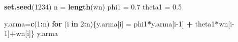 \documentclass[
]{article}
\newenvironment{Shaded}{\begin{snugshade}}{\end{snugshade}}
\newcommand{\ControlFlowTok}[1]{\textcolor[rgb]{0.13,0.29,0.53}{\textbf{#1}}}
\newcommand{\DecValTok}[1]{\textcolor[rgb]{0.00,0.00,0.81}{#1}}
\newcommand{\FloatTok}[1]{\textcolor[rgb]{0.00,0.00,0.81}{#1}}
\newcommand{\FunctionTok}[1]{\textcolor[rgb]{0.13,0.29,0.53}{\textbf{#1}}}
\newcommand{\NormalTok}[1]{#1}
\newcommand{\OtherTok}[1]{\textcolor[rgb]{0.56,0.35,0.01}{#1}}
\newcommand{\SpecialCharTok}[1]{\textcolor[rgb]{0.81,0.36,0.00}{\textbf{#1}}}
\begin{document}
\begin{Shaded}
\begin{Highlighting}[]
\FunctionTok{set.seed}\NormalTok{(}\DecValTok{1234}\NormalTok{)}
\NormalTok{n }\OtherTok{=} \FunctionTok{length}\NormalTok{(wn)}
\NormalTok{phi1 }\OtherTok{=} \FloatTok{0.7}
\NormalTok{theta1 }\OtherTok{=} \FloatTok{0.5}

\NormalTok{y.arma}\OtherTok{=}\FunctionTok{c}\NormalTok{(}\DecValTok{1}\SpecialCharTok{:}\NormalTok{n)}
\ControlFlowTok{for}\NormalTok{ (i }\ControlFlowTok{in} \DecValTok{2}\SpecialCharTok{:}\NormalTok{n)\{y.arma[i] }\OtherTok{=}\NormalTok{ phi1}\SpecialCharTok{*}\NormalTok{y.arma[i}\DecValTok{{-}1}\NormalTok{] }\SpecialCharTok{+}\NormalTok{ theta1}\SpecialCharTok{*}\NormalTok{wn[i}\DecValTok{{-}1}\NormalTok{]}\SpecialCharTok{+}\NormalTok{wn[i]\}}
\NormalTok{y.arma}
\end{Highlighting}
\end{Shaded}
\end{document}
